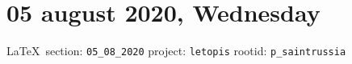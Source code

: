  
 
\section{05 august 2020, Wednesday}
  
\vspace{0.5cm}
{\ifDEBUG\small\LaTeX~section: \verb|05_08_2020| project: \verb|letopis| rootid: \verb|p_saintrussia|}
\vspace{0.5cm}


  
